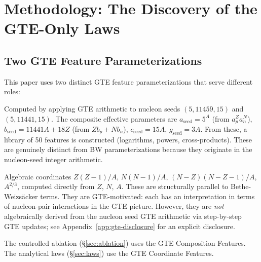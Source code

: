\documentclass[9pt,twocolumn]{extarticle}
\begin{document}
\section{Methodology: The Discovery of the GTE-Only Laws}
\subsection{Two GTE Feature Parameterizations}
\label{sec:two-feature-sets}
This paper uses two distinct GTE feature parameterizations that serve different roles:

\begin{description}[style=nextline,leftmargin=2em]
\item[GTE Composition Features (for controlled ablation).]
Computed by applying GTE arithmetic to nucleon seeds $(5,11459,15)$ and $(5,11441,15)$. The composite effective parameters are
$a_{\mathrm{seed}} = 5^A$ (from $a_p^Z a_n^N$),
$b_{\mathrm{seed}} = 11441A + 18Z$ (from $Z b_p + N b_n$),
$c_{\mathrm{seed}} = 15A$, $g_{\mathrm{seed}} = 3A$.
From these, a library of 50 features is constructed (logarithms, powers, cross-products). These are genuinely distinct from BW parameterizations because they originate in the nucleon-seed integer arithmetic.

\item[GTE Coordinate Features (for 6-term analytical laws).]
Algebraic coordinates $Z(Z-1)/A$, $N(N-1)/A$, $(N-Z)(N-Z-1)/A$, $A^{2/3}$, computed directly from $Z$, $N$, $A$. These are structurally parallel to Bethe-Weizsäcker terms. They are GTE-motivated: each has an interpretation in terms of nucleon-pair interactions in the GTE picture. However, they are \emph{not} algebraically derived from the nucleon seed GTE arithmetic via step-by-step GTE updates; see Appendix~\ref{app:gte-disclosure} for an explicit disclosure.
\end{description}

The controlled ablation (\S\ref{sec:ablation}) uses the GTE Composition Features. The analytical laws (\S\ref{sec:laws}) use the GTE Coordinate Features.
\end{document}
